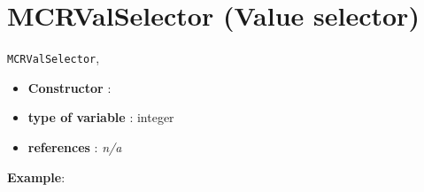 \section{MCRValSelector (Value selector)}\label{mcrvalselector:mcrvalselectorvalselector}\hypertarget{mcrvalselector:mcrvalselectorvalselector}{}
\begin{notedef}
  \texttt{MCRValSelector}, 
\end{notedef}

\begin{itemize}
	\item \textbf{Constructor} : 
	\item \textbf{type of variable} : integer
	\item \textbf{references} : \emph{n/a}
\end{itemize}

\textbf{Example}:
%

